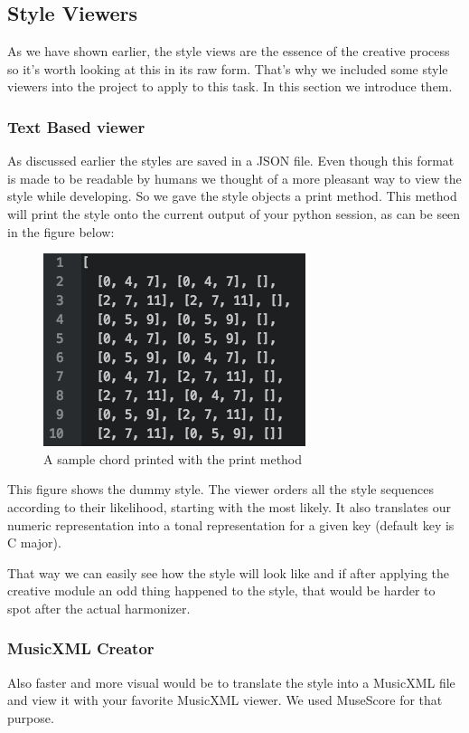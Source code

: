 \subsection{Style Viewers} 
\label{sec:viewers}
As we have shown earlier, the style views are the essence of the creative process so it's worth looking at this in its raw form. That's why we included some style viewers into the project to apply to this task. In this section we introduce them.

\subsubsection{Text Based viewer}
\label{sec:viewers.text}
As discussed earlier the styles are saved in a JSON file. Even though this format is made to be readable by humans we thought of a more pleasant way to view the style while developing. So we gave the style objects a print method. This method will print the style onto the current output of your python session, as can be seen in the figure below:
\begin{figure}[ht]
\centering
\includegraphics[scale=1]{Chapters/pic/text_print.png}
\caption{A sample chord printed with the print method}
\end{figure}

This figure shows the dummy style. The viewer orders all the style sequences according to their likelihood, starting with the most likely. It also translates our numeric representation into a tonal representation for a given key (default key is C major).

That way we can easily see how the style will look like and if after applying the creative module an odd thing happened to the style, that would be harder to spot after the actual harmonizer. 

\subsubsection{MusicXML Creator}
\label{sec:viewers.musicxml}
Also faster and more visual would be to translate the style into a MusicXML file and view it with your favorite MusicXML viewer. We used MuseScore for that purpose. 

